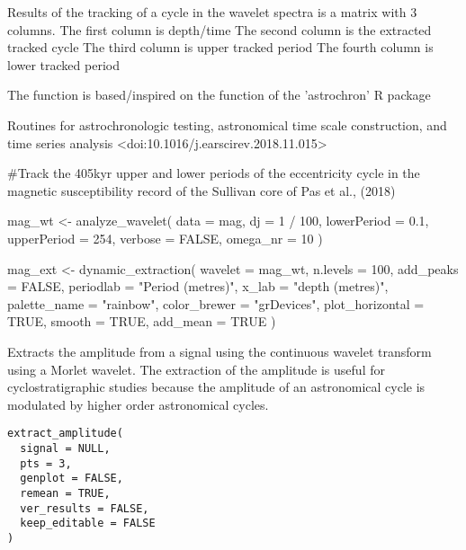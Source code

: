 \documentclass[a4paper]{book}
\begin{document}
%
\begin{Value}
Results of the tracking of a cycle in the wavelet spectra is a matrix with 3 columns.
The first column is depth/time
The second column is the extracted tracked cycle
The third column is upper tracked period
The fourth column is lower tracked period
\end{Value}
%
\begin{Author}
The function is based/inspired on the 
function of the 'astrochron' R package
\end{Author}
%
\begin{References}
Routines for astrochronologic testing, astronomical time scale construction, and
time series analysis <doi:10.1016/j.earscirev.2018.11.015>
\end{References}
%
\begin{Examples}
\begin{ExampleCode}

#Track the 405kyr upper and lower periods of the eccentricity cycle in the
magnetic susceptibility record of the Sullivan core of Pas et al., (2018)

mag_wt <- analyze_wavelet(
 data = mag,
 dj = 1 / 100,
 lowerPeriod = 0.1,
 upperPeriod = 254,
 verbose = FALSE,
 omega_nr = 10
)

mag_ext <- dynamic_extraction(
 wavelet = mag_wt,
 n.levels = 100,
 add_peaks = FALSE,
 periodlab = "Period (metres)",
 x_lab = "depth (metres)",
 palette_name = "rainbow",
 color_brewer = "grDevices",
 plot_horizontal = TRUE,
 smooth = TRUE,
 add_mean = TRUE
)


\end{ExampleCode}
\end{Examples}
%
\begin{Description}
Extracts the amplitude from a signal using the continuous wavelet transform using a Morlet wavelet.
The extraction of the amplitude is useful for cyclostratigraphic studies because the amplitude of
an astronomical cycle is modulated by higher order astronomical cycles.
\end{Description}
%
\begin{Usage}
\begin{verbatim}
extract_amplitude(
  signal = NULL,
  pts = 3,
  genplot = FALSE,
  remean = TRUE,
  ver_results = FALSE,
  keep_editable = FALSE
)
\end{verbatim}
\end{Usage}
\end{document}
